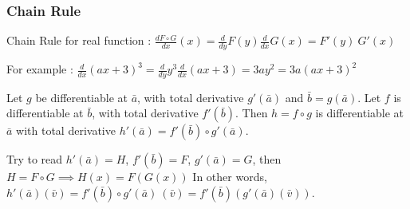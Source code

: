 \subsubsection{Chain Rule}
\begin{commentary}
Chain Rule for real function : $\frac{d F \circ G}{dx}(x) = \frac{d}{dy}F(y) \frac{d}{dx}G(x) = F'(y)\ G'(x)$

For example : $\frac{d}{dx} (ax+3)^3 = \frac{d}{dy}y^3 \frac{d}{dx} \left(ax+3\right) = 3ay^2 = 3a(ax+3)^2$
\end{commentary}
\begin{theorem}
Let $g$ be differentiable at $\bar{a}$, with total derivative $g'(\bar{a})$ and $\bar{b} = g(\bar{a})$.
Let $f$ is differentiable at $\bar{b}$, with total derivative $f'(\bar{b})$.
Then $h = f \circ g$ is differentiable at $\bar{a}$ with total derivative $h'(\bar{a}) = f'(\bar{b}) \circ g'(\bar{a})$.
\begin{commentary}
Try to read $h'(\bar{a}) = H$, $f'(\bar{b}) = F$, $g'(\bar{a}) = G$, then $H = F \circ G \implies H(x) = F(G(x))$
In other words, $h'(\bar{a})(\bar{v}) = f'(\bar{b}) \circ g'(\bar{a})\ (\bar{v}) = f'(\bar{b})(g'(\bar{a})(\bar{v}))$.
\end{commentary}
\end{theorem}

